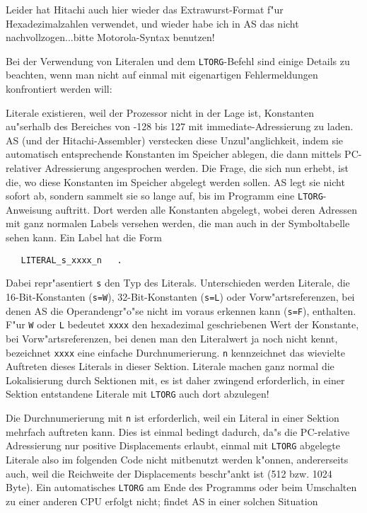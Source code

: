 \documentclass[12pt,a4paper,twoside]{report}
\newcommand{\tty}[1]{{\tt #1}}
\begin{document}
Leider hat Hitachi auch hier wieder das Extrawurst-Format f"ur
Hexadezimalzahlen verwendet, und wieder habe ich in AS das nicht
nachvollzogen...bitte Motorola-Syntax benutzen!
\par
Bei der Verwendung von Literalen und dem \tty{LTORG}-Befehl sind
einige Details zu beachten, wenn man nicht auf einmal mit eigenartigen
Fehlermeldungen konfrontiert werden will:
\par
Literale existieren, weil der Prozessor nicht in der Lage ist, Konstanten
au"serhalb des Bereiches von -128 bis 127 mit immediate-Adressierung
zu laden.  AS (und der Hitachi-Assembler) verstecken diese Unzul"anglichkeit,
indem sie automatisch entsprechende Konstanten im Speicher ablegen, die
dann mittels PC-relativer Adressierung angesprochen werden.  Die Frage, die
sich nun erhebt, ist die, wo diese Konstanten im Speicher abgelegt werden
sollen.  AS legt sie nicht sofort ab, sondern sammelt sie so lange
auf, bis im Programm eine \tty{LTORG}-Anweisung auftritt.  Dort werden
alle Konstanten abgelegt, wobei deren Adressen mit ganz normalen
Labels versehen werden, die man auch in der Symboltabelle sehen kann.
Ein Label hat die Form
\begin{verbatim}
   LITERAL_s_xxxx_n   .
\end{verbatim}
Dabei repr"asentiert \tty{s} den Typ des Literals.  Unterschieden werden
Literale, die 16-Bit-Konstanten (\tty{s=W}), 32-Bit-Konstanten (\tty{s=L})
oder Vorw"artsreferenzen, bei denen AS die Operandengr"o"se nicht
im voraus erkennen kann (\tty{s=F}), enthalten.  F"ur \tty{W} oder \tty{L}
bedeutet \tty{xxxx} den hexadezimal geschriebenen Wert der Konstante, bei
Vorw"artsreferenzen, bei denen man den Literalwert ja noch nicht kennt,
bezeichnet \tty{xxxx} eine einfache Durchnumerierung. \tty{n} kennzeichnet
das wievielte Auftreten dieses Literals in dieser Sektion.  Literale machen
ganz normal die Lokalisierung durch Sektionen mit, es ist daher zwingend
erforderlich, in einer Sektion entstandene Literale mit \tty{LTORG} auch
dort abzulegen!
\par
Die Durchnumerierung mit \tty{n} ist erforderlich, weil ein Literal in
einer Sektion mehrfach auftreten kann.  Dies ist einmal bedingt dadurch,
da"s die PC-relative Adressierung nur positive Displacements erlaubt,
einmal mit \tty{LTORG} abgelegte Literale also im folgenden Code nicht
mitbenutzt werden k"onnen, andererseits auch, weil die Reichweite der
Displacements beschr"ankt ist (512 bzw. 1024 Byte).
Ein automatisches \tty{LTORG} am Ende des Programms oder beim Umschalten
zu einer anderen CPU erfolgt nicht; findet AS in einer solchen Situation
\end{document}
